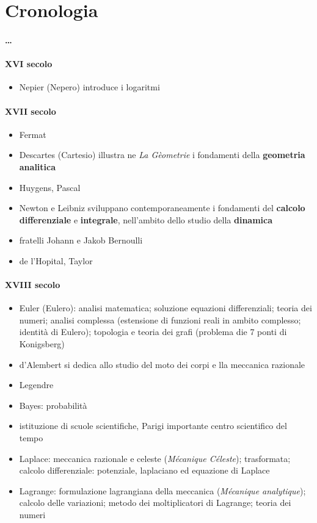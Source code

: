 
\section{Cronologia}
\paragraph{\dots}
\paragraph{XVI secolo}
\begin{itemize}
  \item Nepier (Nepero) introduce i logaritmi
\end{itemize}
\paragraph{XVII secolo}
\begin{itemize}
  \item Fermat
  \item Descartes (Cartesio) illustra ne \textit{La Gèometrie} i fondamenti della \textbf{geometria analitica}
  \item Huygens, Pascal
  \item Newton e Leibniz sviluppano contemporaneamente i fondamenti del \textbf{calcolo differenziale} e \textbf{integrale}, nell'ambito dello studio della \textbf{dinamica}
  \item fratelli Johann e Jakob Bernoulli
  \item de l'Hopital, Taylor
\end{itemize}
\paragraph{XVIII secolo}
\begin{itemize}
  \item Euler (Eulero): analisi matematica; soluzione equazioni differenziali; teoria dei numeri; analisi complessa (estensione di funzioni reali in ambito complesso; identità di Eulero); topologia e teoria dei grafi (problema die 7 ponti di Konigsberg)
  \item d'Alembert si dedica allo studio del moto dei corpi e lla meccanica razionale
  \item Legendre
  \item Bayes: probabilità
  \item istituzione di scuole scientifiche, Parigi importante centro scientifico del tempo
  \item Laplace: meccanica razionale e celeste (\textit{Mécanique Céleste}); trasformata; calcolo differenziale: potenziale, laplaciano ed equazione di Laplace
  \item Lagrange: formulazione lagrangiana della meccanica (\textit{Mécanique analytique}); calcolo delle variazioni; metodo dei moltiplicatori di Lagrange; teoria dei numeri
\end{itemize}

